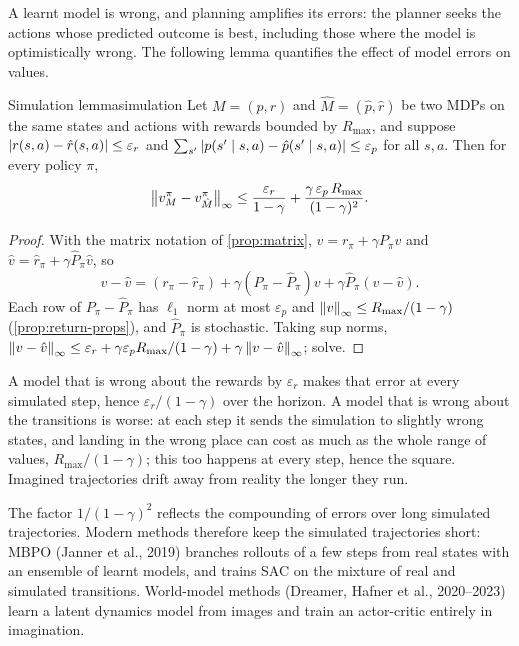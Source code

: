 A learnt model is wrong, and planning amplifies its errors: the planner
seeks the actions whose predicted outcome is best, including those where
the model is optimistically wrong. The following lemma quantifies the
effect of model errors on values.

\begin{lemma}{Simulation lemma}{simulation}
  Let $M = (p, r)$ and $\hat M = (\hat p, \hat r)$ be two MDPs on the same
  states and actions with rewards bounded by $R_{\max}$, and suppose
  $\left\lvert r(s, a) - \hat r(s, a) \right\rvert \leq \varepsilon_r$ and $\sum_{s'}
  \left\lvert p(s' \mid s, a) - \hat p(s' \mid s, a) \right\rvert \leq \varepsilon_p$ for all
  $s, a$. Then for every policy $\pi$,
  \begin{equation}
    \left\lVert v^\pi_M - v^\pi_{\hat M} \right\rVert_\infty \leq \frac{\varepsilon_r}{1 -
    \gamma} + \frac{\gamma\, \varepsilon_p\, R_{\max}}{(1 - \gamma)^2}.
  \end{equation}
\end{lemma}

\begin{proof}
  With the matrix notation of \cref{prop:matrix}, $v = r_\pi + \gamma P_\pi
  v$ and $\hat v = \hat r_\pi + \gamma \hat P_\pi \hat v$, so
  \begin{equation*}
    v - \hat v = (r_\pi - \hat r_\pi) + \gamma (P_\pi - \hat P_\pi) v +
    \gamma \hat P_\pi (v - \hat v).
  \end{equation*}
  Each row of $P_\pi - \hat P_\pi$ has $\ell_1$ norm at most
  $\varepsilon_p$ and $\left\lVert v \right\rVert_\infty \leq R_{\max} / (1 - \gamma)$
  (\cref{prop:return-props}), and $\hat P_\pi$ is stochastic. Taking sup
  norms, $\left\lVert v - \hat v \right\rVert_\infty \leq \varepsilon_r + \gamma
  \varepsilon_p R_{\max} / (1 - \gamma) + \gamma \left\lVert v - \hat
  v \right\rVert_\infty$; solve.
\end{proof}

\begin{intuition}
  A model that is wrong about the rewards by $\varepsilon_r$ makes that
  error at every simulated step, hence $\varepsilon_r / (1 - \gamma)$ over
  the horizon. A model that is wrong about the transitions is worse: at
  each step it sends the simulation to slightly wrong states, and landing
  in the wrong place can cost as much as the whole range of values,
  $R_{\max} / (1 - \gamma)$; this too happens at every step, hence the
  square. Imagined trajectories drift away from reality the longer they
  run.
\end{intuition}

The factor $1 / (1 - \gamma)^2$ reflects the compounding of errors over
long simulated trajectories. Modern methods therefore keep the simulated
trajectories short: MBPO (Janner et al., 2019) branches rollouts of a few
steps from real states with an ensemble of learnt models, and trains SAC
on the mixture of real and simulated transitions. World-model methods
(Dreamer, Hafner et al., 2020--2023) learn a latent dynamics model from
images and train an actor-critic entirely in imagination.

